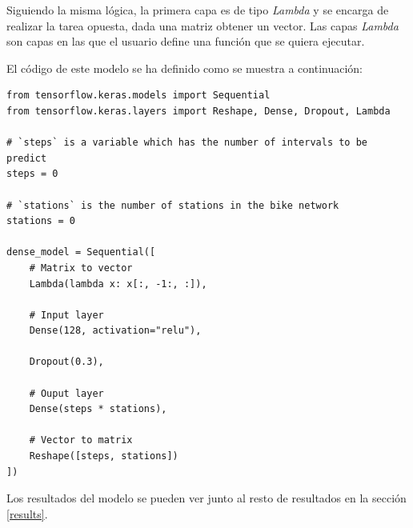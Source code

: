 Siguiendo la misma lógica, la primera capa es de tipo \textit{Lambda} y se encarga de realizar la tarea opuesta, dada una matriz obtener un vector. Las capas \textit{Lambda} son capas en las que el usuario define una función que se quiera ejecutar.
\newline

El código de este modelo se ha definido como se muestra a continuación:

\begin{verbatim}
from tensorflow.keras.models import Sequential
from tensorflow.keras.layers import Reshape, Dense, Dropout, Lambda

# `steps` is a variable which has the number of intervals to be predict
steps = 0 

# `stations` is the number of stations in the bike network
stations = 0

dense_model = Sequential([
    # Matrix to vector
    Lambda(lambda x: x[:, -1:, :]), 
    
    # Input layer
    Dense(128, activation="relu"),

    Dropout(0.3),
    
    # Ouput layer
    Dense(steps * stations),
                  
    # Vector to matrix
    Reshape([steps, stations])
])
\end{verbatim}


Los resultados del modelo se pueden ver junto al resto de resultados en la sección \ref{results}.